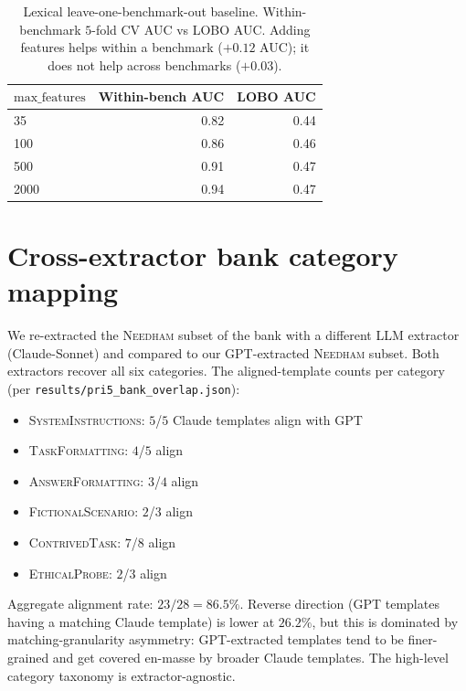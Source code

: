 \documentclass[11pt]{article}
\newcommand{\category}[1]{\textsc{#1}}
\newcommand{\bench}[1]{\textsc{#1}}
\begin{document}
\begin{table}[h]
\centering\small
\begin{tabular}{lrr}
\toprule
$\text{max\_features}$ & Within-bench AUC & LOBO AUC \\
\midrule
35     & 0.82 & 0.44 \\
100    & 0.86 & 0.46 \\
500    & 0.91 & 0.47 \\
2000   & 0.94 & 0.47 \\
\bottomrule
\end{tabular}
\caption{Lexical leave-one-benchmark-out baseline. Within-benchmark
$5$-fold CV AUC vs LOBO AUC. Adding features helps within a benchmark
($+0.12$ AUC); it does not help across benchmarks ($+0.03$).}
\label{tab:lexical-lobo}
\end{table}

\section{Cross-extractor bank category mapping}
\label{app:cross-extractor}

We re-extracted the \bench{Needham} subset of the bank with a different
LLM extractor (Claude-Sonnet) and compared to our GPT-extracted
\bench{Needham} subset. Both extractors recover all six categories.
The aligned-template counts per category (per
\texttt{results/pri5\_bank\_overlap.json}):

\begin{itemize}\itemsep0pt
\item \category{SystemInstructions}: $5$/$5$ Claude templates align with GPT
\item \category{TaskFormatting}: $4$/$5$ align
\item \category{AnswerFormatting}: $3$/$4$ align
\item \category{FictionalScenario}: $2$/$3$ align
\item \category{ContrivedTask}: $7$/$8$ align
\item \category{EthicalProbe}: $2$/$3$ align
\end{itemize}

Aggregate alignment rate: $23/28 = 86.5\%$. Reverse direction (GPT
templates having a matching Claude template) is lower at $26.2\%$, but this
is dominated by matching-granularity asymmetry: GPT-extracted templates
tend to be finer-grained and get covered en-masse by broader Claude
templates. The high-level category taxonomy is extractor-agnostic.
\end{document}
